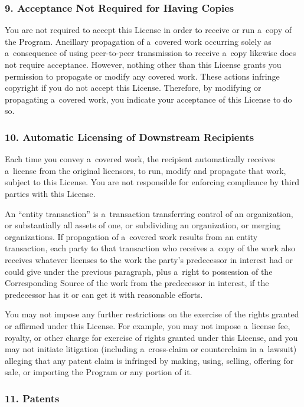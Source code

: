 \documentclass[a4paper, 11pt, twoside]{article}
\begin{document}
\subsubsection{9. Acceptance Not Required for Having Copies}

You are not required to accept this License in order to receive or run a~copy of the Program. Ancillary propagation of a~covered work occurring solely as a~consequence of using peer-to-peer transmission to receive a~copy likewise does not require acceptance. However, nothing other than this License grants you permission to propagate or modify any covered work. These actions infringe copyright if you do not accept this License. Therefore, by modifying or propagating a~covered work, you indicate your acceptance of this License to do
so.

\subsubsection{10. Automatic Licensing of Downstream Recipients}

Each time you convey a~covered work, the recipient automatically receives a~license from the original licensors, to run, modify and propagate that work, subject to this License. You are not responsible for enforcing compliance by third parties with this License.

An “entity transaction” is a~transaction transferring control of an organization, or substantially all assets of one, or subdividing an organization, or merging organizations. If propagation of a~covered work results from an entity transaction, each party to that transaction who receives a~copy of the work also receives whatever licenses to the work the party's predecessor in interest had or could give under the previous paragraph, plus a~right to possession of the Corresponding Source of the work from the predecessor in interest, if the predecessor has it or can get it with reasonable efforts.

You may not impose any further restrictions on the exercise of the rights granted or affirmed under this License. For example, you may not impose a~license fee, royalty, or other charge for exercise of rights granted under this License, and you may not initiate litigation (including a~cross-claim or counterclaim in a~lawsuit) alleging that any patent claim is infringed by making, using, selling, offering for sale, or importing the Program or any portion of it.

\subsubsection{11. Patents}
\end{document}
